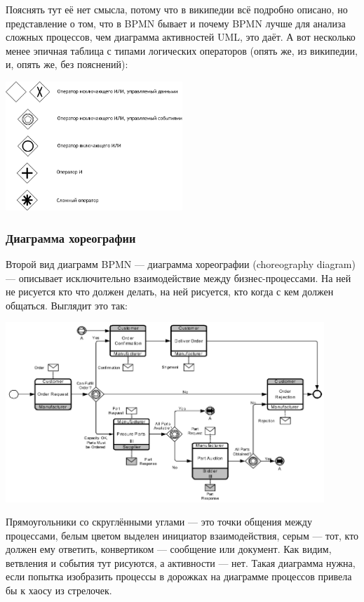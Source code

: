 \documentclass{../../text-style}
\begin{document}
Пояснять тут её нет смысла, потому что в википедии всё подробно описано, но представление о том, что в BPMN бывает и почему BPMN лучше для анализа сложных процессов, чем диаграмма активностей UML, это даёт. А вот несколько менее эпичная таблица с типами логических операторов (опять же, из википедии, и, опять же, без пояснений):

\begin{center}
    \includegraphics[width=0.5\textwidth]{bpmnGateways.png}
\end{center}

\subsubsection{Диаграмма хореографии}

Второй вид диаграмм BPMN --- диаграмма хореографии (choreography diagram) --- описывает исключительно взаимодействие между бизнес-процессами. На ней не рисуется кто что должен делать, на ней рисуется, кто когда с кем должен общаться. Выглядит это так:

\begin{center}
    \includegraphics[width=0.9\textwidth]{bpmnChoreography.png}
\end{center}

Прямоугольники со скруглёнными углами --- это точки общения между процессами, белым цветом выделен инициатор взаимодействия, серым --- тот, кто должен ему ответить, конвертиком --- сообщение или документ. Как видим, ветвления и события тут рисуются, а активности --- нет. Такая диаграмма нужна, если попытка изобразить процессы в дорожках на диаграмме процессов привела бы к хаосу из стрелочек.
\end{document}
